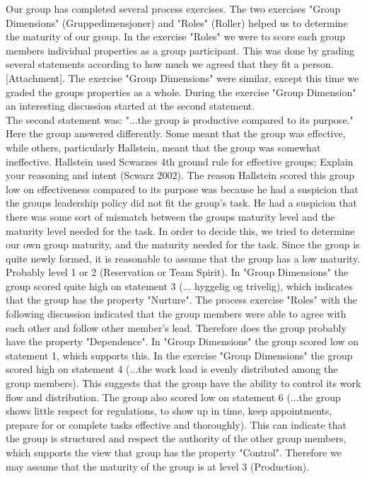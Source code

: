 \usepackage{comment}

Our group has completed several process exercises. The two exercises "Group Dimensions" (Gruppedimensjoner) and "Roles" (Roller) helped us to determine the  maturity of our group. In the exercise "Roles" we were to score each group members individual properties as a group participant. This was done by grading several statements according to how much we agreed that they fit a person. [Attachment]. The exercise "Group Dimensions" were similar, except this time we graded the groups properties as a whole. During the exercise "Group Dimension" an interesting discussion started at the second statement. 
\\
The second statement was: "...the group is productive compared to its purpose." Here the group answered differently. Some meant that the group was effective, while others, particularly Hallstein, meant that the group was somewhat ineffective. Hallstein used Scwarzes 4th ground rule for effective groups; Explain your reasoning and intent (Scwarz 2002). The reason Hallstein scored this group low on effectiveness compared to its purpose was because he had a suspicion that the groups leadership policy did not fit the group's task. He had a suspicion that there was some sort of mismatch between the groups maturity level and the maturity level needed for the task. In order to decide this, we tried to determine our own group maturity, and the maturity needed for the task.  
	Since the group is quite newly formed, it is reasonable to assume that the group has a low maturity. Probably level 1 or 2 (Reservation or Team Spirit). In "Group Dimensions" the group scored quite high on statement 3 (... hyggelig og trivelig), which indicates that the group has the property "Nurture". The process exercise "Roles" with the following discussion indicated that the group members were able to agree with each other and follow other member's lead. Therefore does the group probably have the property "Dependence". In "Group Dimensions" the group scored low on statement 1, which supports this. 
	In the exercise "Group Dimensions" the group scored high on statement 4 (...the work load is evenly distributed among the group members). This suggests that the group have the ability to control its work flow and distribution. The group also scored low on statement 6 (...the group shows little respect for regulations, to show up in time, keep appointments, prepare for or complete tasks effective and thoroughly). This can indicate that the group is structured and respect the authority of the other group members, which supports the view that group has the property "Control". Therefore we may assume that the maturity of the group is at level 3 (Production).
